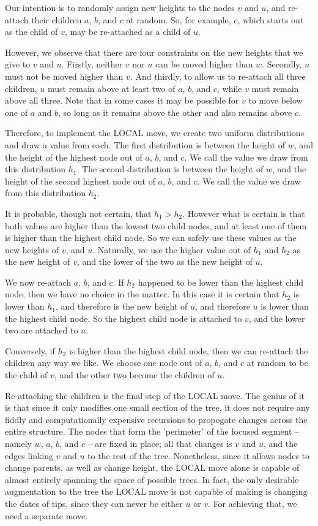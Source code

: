 \documentclass[10pt,journal,compsoc]{IEEEtran}
\begin{document}
Our intention is to randomly assign new heights to the nodes $v$ and $u$, and re-attach their children $a$, $b$, and $c$ at random. So, for example, $c$, which starts out as the child of $v$, may be re-attached as a child of $u$.

However, we observe that there are four constraints on the new heights that we give to $v$ and $u$. Firstly, neither $v$ nor $u$ can be moved higher than $w$. Secondly, $u$ must not be moved higher than $v$. And thirdly, to allow us to re-attach all three children, $u$ must remain above at least two of $a$, $b$, and $c$, while $v$ must remain above all three. Note that in some cases it may be possible for $v$ to move below one of $a$ and $b$, so long as it remains above the other and also remains above $c$.

Therefore, to implement the LOCAL move, we create two uniform distributions and draw a value from each. The first distribution is between the height of $w$, and the height of the highest node out of $a$, $b$, and $c$. We call the value we draw from this distribution $h_1$. The second distribution is between the height of $w$, and the height of the second highest node out of $a$, $b$, and $c$. We call the value we draw from this distribution $h_2$.

It is probable, though not certain, that $h_1 > h_2$. However what is certain is that both values are higher than the lowest two child nodes, and at least one of them is higher than the highest child node. So we can safely use these values as the new heights of $v$, and $u$. Naturally, we use the higher value out of $h_1$ and $h_2$ as the new height of $v$, and the lower of the two as the new height of $u$.

We now re-attach $a$, $b$, and $c$. If $h_2$ happened to be lower than the highest child node, then we have no choice in the matter. In this case it is certain that $h_2$ is lower than $h_1$, and therefore is the new height of $u$, and therefore $u$ is lower than the highest child node. So the highest child node is attached to $v$, and the lower two are attached to $u$.

Conversely, if $h_2$ is higher than the highest child node, then we can re-attach the children any way we like. We choose one node out of $a$, $b$, and $c$ at random to be the child of $v$, and the other two become the children of $u$.

Re-attaching the children is the final step of the LOCAL move. The genius of it is that since it only modifies one small section of the tree, it does not require any fiddly and computationally expensive recursions to propogate changes across the entire structure. The nodes that form the 'perimeter' of the focused segment -- namely $w$, $a$, $b$, and $c$ -- are fixed in place; all that changes is $v$ and $u$, and the edges linking $v$ and $u$ to the rest of the tree. Nonetheless, since it allows nodes to change parents, as well as change height, the LOCAL move alone is capable of almost entirely spanning the space of possible trees. In fact, the only desirable augmentation to the tree the LOCAL move is not capable of making is changing the dates of tips, since they can never be either $u$ or $v$. For achieving that, we need a separate move.
\end{document}

